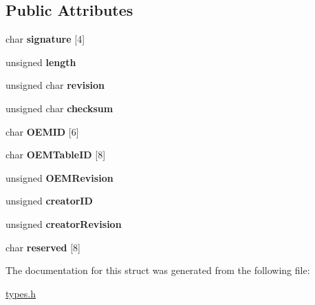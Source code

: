 \subsection*{Public Attributes}
\begin{DoxyCompactItemize}
\item 
\mbox{\label{struct_m_c_f_g_header_a22b92d6805395592f50b9e9bc29e10df}} 
char {\bfseries signature} \mbox{[}4\mbox{]}
\item 
\mbox{\label{struct_m_c_f_g_header_a621db3813e8b6b1fa6a19c061efbfd02}} 
unsigned {\bfseries length}
\item 
\mbox{\label{struct_m_c_f_g_header_a7f5a3f585900180ed744aa3a360beabf}} 
unsigned char {\bfseries revision}
\item 
\mbox{\label{struct_m_c_f_g_header_ac4068aa15a9c7615a0b4b56c94317ad3}} 
unsigned char {\bfseries checksum}
\item 
\mbox{\label{struct_m_c_f_g_header_a41f92a0973011550d26aff4f3b127d97}} 
char {\bfseries O\+E\+M\+ID} \mbox{[}6\mbox{]}
\item 
\mbox{\label{struct_m_c_f_g_header_ad3d67bd8da58f78fb582561c9b5780ab}} 
char {\bfseries O\+E\+M\+Table\+ID} \mbox{[}8\mbox{]}
\item 
\mbox{\label{struct_m_c_f_g_header_ab27a08c03ed5ec7a0c22681089269c9a}} 
unsigned {\bfseries O\+E\+M\+Revision}
\item 
\mbox{\label{struct_m_c_f_g_header_af4ca343e759c3d8b1cc527d082d19ac0}} 
unsigned {\bfseries creator\+ID}
\item 
\mbox{\label{struct_m_c_f_g_header_ada979c0affe38bf0c0c80f8de6356bb4}} 
unsigned {\bfseries creator\+Revision}
\item 
\mbox{\label{struct_m_c_f_g_header_ab705b7e929202f5876da9e0a6d474c7b}} 
char {\bfseries reserved} \mbox{[}8\mbox{]}
\end{DoxyCompactItemize}


The documentation for this struct was generated from the following file\+:\begin{DoxyCompactItemize}
\item 
\mbox{\hyperlink{types_8h}{types.\+h}}\end{DoxyCompactItemize}
